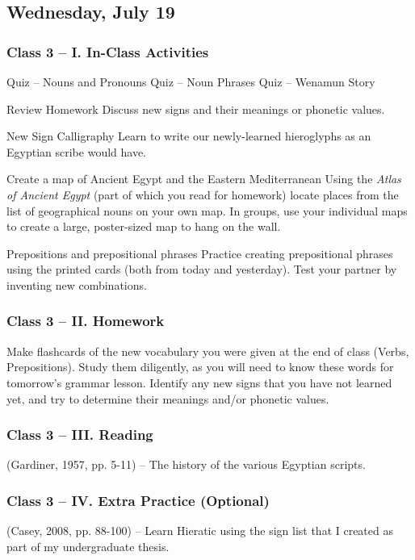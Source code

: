 \documentclass[11pt]{article}
\begin{document}
	\subsection*{Wednesday, July 19}
		\subsubsection*{Class 3 -- I. In-Class Activities}
			\begin{outline}[itemize]
				\1 Quiz -- Nouns and Pronouns
				\1 Quiz -- Noun Phrases
				\1 Quiz -- Wenamun Story
				
				\1 Review Homework
					\2 Discuss new signs and their meanings or phonetic values.
				
				\1 New Sign Calligraphy
					\2 Learn to write our newly-learned hieroglyphs as an Egyptian scribe would have.
					
				\1 Create a map of Ancient Egypt and the Eastern Mediterranean
					\2 Using the \emph{Atlas of Ancient Egypt} (part of which you read for homework)
						locate places from the list of geographical nouns on your own map.
					\2 In groups, use your individual maps to create a large, poster-sized map to hang on the wall.
				
				\1 Prepositions and prepositional phrases
					\2 Practice creating prepositional phrases using the printed cards (both from today and yesterday).
					\2 Test your partner by inventing new combinations.
					
			\end{outline}
			
		\subsubsection*{Class 3 -- II. Homework}
			Make flashcards of the new vocabulary you were given at the end of class (Verbs, Prepositions).
			Study them diligently, as you will need to know these words for tomorrow's grammar lesson.
			Identify any new signs that you have not learned yet, and try to determine their meanings and/or phonetic values.
			
		\subsubsection*{Class 3 -- III. Reading}
			(Gardiner, 1957, pp. 5-11) -- The history of the various Egyptian scripts.
			
		\subsubsection*{Class 3 -- IV. Extra Practice (Optional)}
			(Casey, 2008, pp. 88-100) -- Learn Hieratic using the sign list that I created as part of my undergraduate thesis.
			
\end{document}
